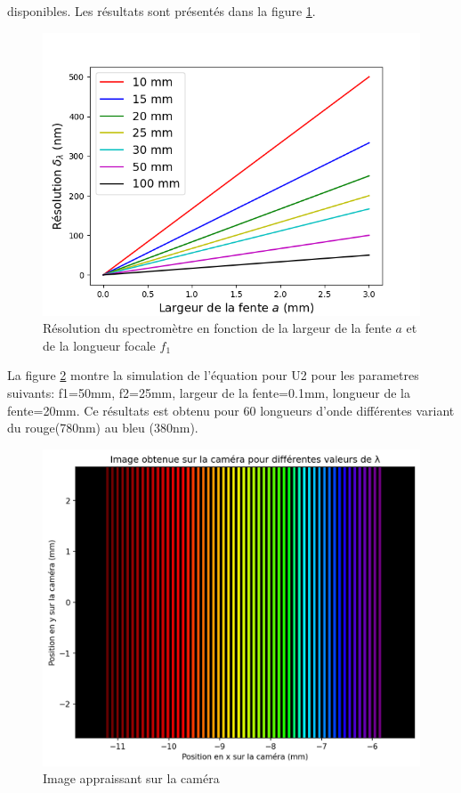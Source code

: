 \documentclass[conference]{IEEEtran}
\begin{document}
disponibles. Les résultats sont présentés dans la figure \ref{res}.
\begin{figure}[H]
    \centering
    \includegraphics[scale=0.5]{Resolution.png}
    \caption{Résolution du spectromètre en fonction de la largeur de la fente $a$ et de la longueur focale $f_1$}
    \label{res}
\end{figure}
 La figure \ref{arc-en-ciel} montre la simulation de l'équation pour U2 pour les parametres suivants: 
 f1=50mm, f2=25mm, largeur de la fente=0.1mm, longueur de la fente=20mm. Ce résultats est obtenu pour
 60 longueurs d'onde différentes variant du rouge(780nm) au bleu (380nm). 
 \begin{figure}[H]
    \centering
    \includegraphics[scale=0.45]{simulation.png}
    \caption{Image appraissant sur la caméra}
    \label{arc-en-ciel}
\end{figure}
\end{document}
